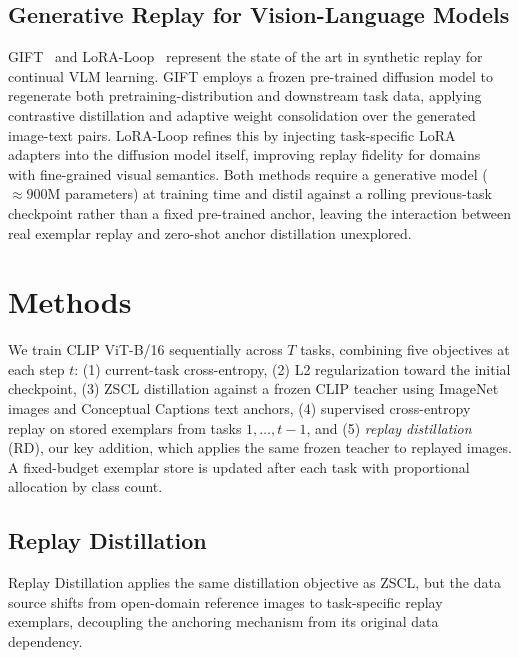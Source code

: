 \documentclass{article}
\let\cite\citep
\begin{document}
  \subsection{Generative Replay for Vision-Language Models}
  GIFT~\cite{gift2025} and LoRA-Loop~\cite{loraloop2025} represent the state of
  the art in synthetic replay for continual VLM learning. GIFT employs a frozen
  pre-trained diffusion model to regenerate both pretraining-distribution and
  downstream task data, applying contrastive distillation and adaptive weight
  consolidation over the generated image-text pairs. LoRA-Loop refines this by
  injecting task-specific LoRA adapters into the diffusion model itself, improving
  replay fidelity for domains with fine-grained visual semantics. Both methods
  require a generative model (${\approx}900$M parameters) at training time and
  distil against a rolling previous-task checkpoint rather than a fixed pre-trained
  anchor, leaving the interaction between real exemplar replay and zero-shot anchor
  distillation unexplored.

  \section{Methods}
\label{sec:method}
We train CLIP ViT-B/16 sequentially across $T$ tasks, combining five objectives at each step $t$: (1) current-task cross-entropy, (2) L2 regularization toward the initial checkpoint, (3) ZSCL distillation against a frozen CLIP teacher using ImageNet images and Conceptual Captions text anchors, (4) supervised cross-entropy replay on stored exemplars from tasks $1, \ldots, t{-}1$, and (5) \emph{replay distillation} (RD), our key addition, which applies the same frozen teacher to replayed images. A fixed-budget exemplar store is updated after each task with proportional allocation by class count.

  \subsection{Replay Distillation}
  
  \label{sec:method-rd}

  Replay Distillation applies the same distillation objective as ZSCL, but the
  data source shifts from open-domain reference images to task-specific replay
  exemplars, decoupling the anchoring mechanism from its original data dependency.
\end{document}

